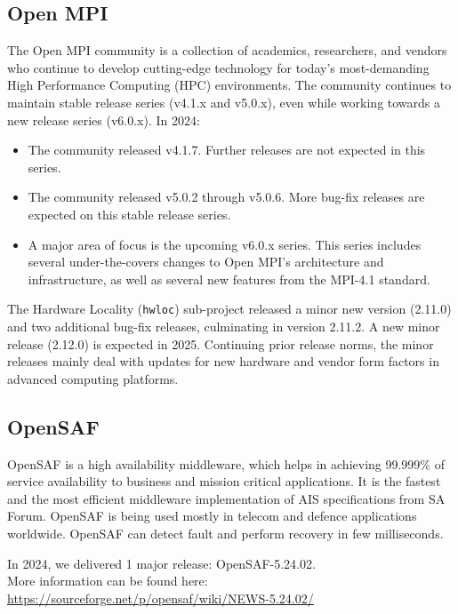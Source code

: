 \documentclass[a4paper]{report}
\begin{document}
\subsection{Open MPI}

The Open MPI community is a collection of academics, researchers, and vendors who continue to develop cutting-edge technology for today’s most-demanding High Performance Computing (HPC) environments.  The community continues to maintain stable release series (v4.1.x and v5.0.x), even while working towards a new release series (v6.0.x).
In 2024:

\begin{itemize}

\item The community released v4.1.7. Further releases are not expected in this series.

\item The community released v5.0.2 through v5.0.6.  More bug-fix releases are expected on this stable release series.

\item A major area of focus is the upcoming v6.0.x series. This series includes several under-the-covers changes to Open MPI’s architecture and infrastructure, as well as several new features from the MPI-4.1 standard.

\end{itemize}

The Hardware Locality ({\tt hwloc}) sub-project released a minor new version (2.11.0) and two additional bug-fix releases, culminating in version 2.11.2.  A new minor release (2.12.0) is expected in 2025.  Continuing prior release norms, the minor releases mainly deal with updates for new hardware and vendor form factors in advanced computing platforms.

\subsection{OpenSAF}

OpenSAF is a high availability middleware, which helps in achieving 99.999\% of service availability to business and mission critical applications. It is the fastest and the most efficient middleware implementation of AIS specifications from SA Forum. OpenSAF is being used mostly in telecom and defence applications worldwide. OpenSAF can detect fault and perform recovery in few milliseconds.

In 2024, we delivered 1 major release: OpenSAF-5.24.02.\\
More information can be found here: \href{https://sourceforge.net/p/opensaf/wiki/NEWS-5.24.02/}{https://sourceforge.net/p/opensaf/wiki/NEWS-5.24.02/}
\end{document}
